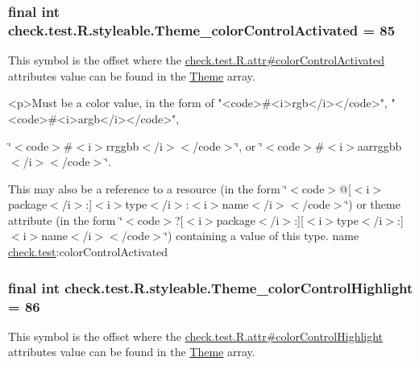 \subsubsection[{Theme\+\_\+color\+Control\+Activated}]{\setlength{\rightskip}{0pt plus 5cm}final int check.\+test.\+R.\+styleable.\+Theme\+\_\+color\+Control\+Activated = 85\hspace{0.3cm}{\ttfamily [static]}}\label{classcheck_1_1test_1_1_r_1_1styleable_a1d6c74771db390d0820612ca1d065c4d}
This symbol is the offset where the \hyperlink{classcheck_1_1test_1_1_r_1_1attr_a14f760733777b8233047aeac34c893e6}{check.\+test.\+R.\+attr\#color\+Control\+Activated} attribute\textquotesingle{}s value can be found in the \hyperlink{classcheck_1_1test_1_1_r_1_1styleable_acca726d02016a0cf607782ec3a436a81}{Theme} array.

\begin{DoxyVerb}      <p>Must be a color value, in the form of "<code>#<i>rgb</i></code>", "<code>#<i>argb</i></code>",
\end{DoxyVerb}
 \char`\"{}$<$code$>$\#$<$i$>$rrggbb$<$/i$>$$<$/code$>$\char`\"{}, or \char`\"{}$<$code$>$\#$<$i$>$aarrggbb$<$/i$>$$<$/code$>$\char`\"{}. 

This may also be a reference to a resource (in the form \char`\"{}$<$code$>$@\mbox{[}$<$i$>$package$<$/i$>$\+:\mbox{]}$<$i$>$type$<$/i$>$\+:$<$i$>$name$<$/i$>$$<$/code$>$\char`\"{}) or theme attribute (in the form \char`\"{}$<$code$>$?\mbox{[}$<$i$>$package$<$/i$>$\+:\mbox{]}\mbox{[}$<$i$>$type$<$/i$>$\+:\mbox{]}$<$i$>$name$<$/i$>$$<$/code$>$\char`\"{}) containing a value of this type.  name \hyperlink{namespacecheck_1_1test}{check.\+test}\+:color\+Control\+Activated \hypertarget{classcheck_1_1test_1_1_r_1_1styleable_ac7b968aea5587a45f1935f379de1d8b7}{}
\subsubsection[{Theme\+\_\+color\+Control\+Highlight}]{\setlength{\rightskip}{0pt plus 5cm}final int check.\+test.\+R.\+styleable.\+Theme\+\_\+color\+Control\+Highlight = 86\hspace{0.3cm}{\ttfamily [static]}}\label{classcheck_1_1test_1_1_r_1_1styleable_ac7b968aea5587a45f1935f379de1d8b7}
This symbol is the offset where the \hyperlink{classcheck_1_1test_1_1_r_1_1attr_a2126d505b83f9a4e9ff11e55eb19ebe8}{check.\+test.\+R.\+attr\#color\+Control\+Highlight} attribute\textquotesingle{}s value can be found in the \hyperlink{classcheck_1_1test_1_1_r_1_1styleable_acca726d02016a0cf607782ec3a436a81}{Theme} array.

